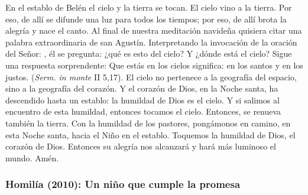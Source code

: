 \begin{body}
	En el establo de Belén el cielo y la tierra se tocan. El cielo vino a la tierra. Por eso, de allí se difunde una luz para todos los tiempos; por eso, de allí brota la alegría y nace el canto. Al final de nuestra meditación navideña quisiera citar una palabra extraordinaria de san Agustín. Interpretando la invocación de la oración del Señor: , él se pregunta: ¿qué es esto del cielo? Y ¿dónde está el cielo? Sigue una respuesta sorprendente: Que estás en los cielos significa: en los santos y en los justos.  (\emph{Serm. in monte} II 5,17). El cielo no pertenece a la geografía del espacio, sino a la geografía del corazón. Y el corazón de Dios, en la Noche santa, ha descendido hasta un establo: la humildad de Dios es el cielo. Y si salimos al encuentro de esta humildad, entonces tocamos el cielo. Entonces, se renueva también la tierra. Con la humildad de los pastores, pongámonos en camino, en esta Noche santa, hacia el Niño en el establo. Toquemos la humildad de Dios, el corazón de Dios. Entonces su alegría nos alcanzará y hará más luminoso el mundo. Amén.
\end{body}

\subsubsection{Homilía (2010): Un niño que cumple la promesa}



